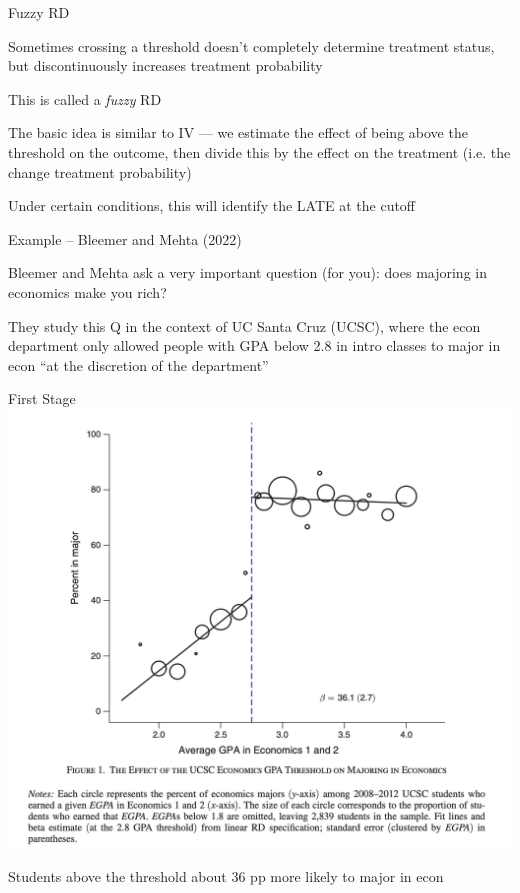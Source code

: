 \documentclass[11pt,english,handout]{beamer}
\newenvironment{wideitemize}{\itemize\addtolength{\itemsep}{10pt}}{\enditemize}
\begin{document}
\begin{frame}{Fuzzy RD}
	\begin{wideitemize}
		\item
		Sometimes crossing a threshold doesn't completely determine treatment status, but discontinuously increases treatment probability 
		
		\item
		This is called a \textit{fuzzy} RD
		
		\pause
		\item
		The basic idea is similar to IV --- we estimate the effect of being above the threshold on the outcome, then divide this by the effect on the treatment (i.e. the change treatment probability)
		
		\pause
		\item
		Under certain conditions, this will identify the LATE at the cutoff
	\end{wideitemize}
\end{frame}

\begin{frame}{Example -- Bleemer and Mehta (2022)}
	\begin{wideitemize}
		\item
		Bleemer and Mehta ask a very important question (for you): does majoring in economics make you rich?
		
		\pause
		\item
		They study this Q in the context of UC Santa Cruz (UCSC), where the econ department only allowed people with GPA below 2.8 in intro classes to major in econ ``at the discretion of the department''
	\end{wideitemize}
\end{frame}

\begin{frame}{First Stage}
	\centering
	\includegraphics[width = 0.7 \linewidth]{bleemer-first-stage}
	
	Students above the threshold about 36 pp more likely to major in econ
\end{frame}
\end{document}
